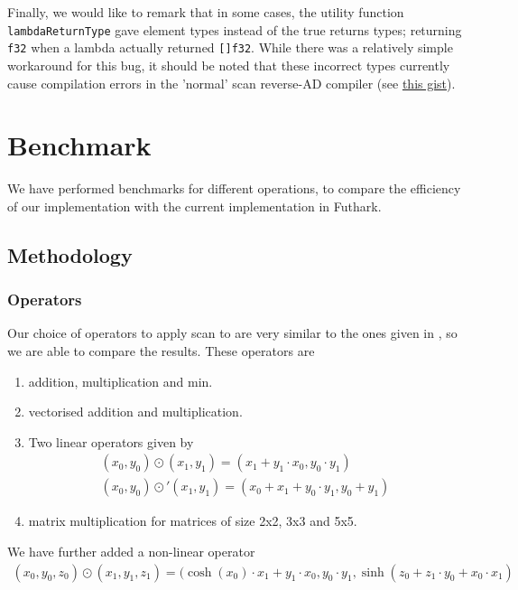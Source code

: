 \documentclass{article}
\begin{document}
Finally, we would like to remark that in some cases, the utility function \lstinline{lambdaReturnType} gave element types instead of the true returns types; returning \lstinline{f32} when a lambda actually returned \lstinline{[]f32}. While there was a relatively simple workaround for this bug, it should be noted that these incorrect types currently cause compilation errors in the 'normal' scan reverse-AD compiler (see \href{https://gist.github.com/p-adema/c8fc4fd5823baca18d90385370aeda5d}{this gist}).

\newpage
\section{Benchmark}
We have performed benchmarks for different operations,
to compare the efficiency of our implementation with the current implementation in Futhark.

\subsection{Methodology}
\subsubsection*{Operators}
Our choice of operators to apply scan to are very similar to the ones given
in \cite{Futhark}, so we are able to compare the results.
These operators are
\begin{enumerate}

	\item addition, multiplication and min.
	\item vectorised addition and multiplication.
	\item Two linear operators given by
	      \begin{align*}
		      (x_{0},y_{0}) \odot (x_{1},y_{1})
		      =
		      (x_{1} + y_{1}\cdot x_{0}, y_{0}\cdot y_{1}) \\
		      (x_{0},y_{0}) \odot' (x_{1},y_{1})
		      =
		      (x_{0} + x_{1} + y_{0}\cdot y_{1}, y_{0}+ y_{1})
	      \end{align*}
	\item matrix multiplication for matrices of size 2x2, 3x3 and 5x5.
\end{enumerate}
We have further added a non-linear operator
\begin{align*}
	(x_{0},y_{0}, z_{0}) \odot (x_{1},y_{1}, z_{1})
	=
	(\cosh (x_{0})\cdot x_{1} + y_{1}\cdot x_{0},
	y_{0}\cdot y_{1},
	\sinh (z_{0} + z_{1}\cdot y_{0} + x_{0}\cdot x_{1} ) \\
\end{align*}
\end{document}
